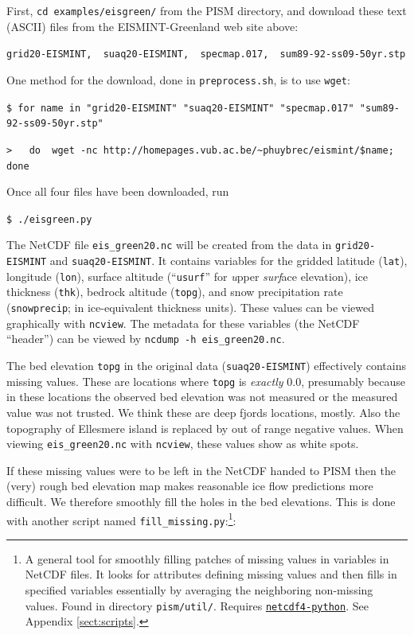\documentclass[11pt,final]{amsart}
\begin{document}
First, \verb|cd examples/eisgreen/| from the PISM directory, and download these text (ASCII) files from the EISMINT-Greenland web site above: 

\verb|grid20-EISMINT,  suaq20-EISMINT,  specmap.017,  sum89-92-ss09-50yr.stp|

\noindent One method for the download, done in \verb|preprocess.sh|, is to use \verb|wget|: \small

\verb|$ for name in "grid20-EISMINT" "suaq20-EISMINT" "specmap.017" "sum89-92-ss09-50yr.stp"|

\verb|>   do  wget -nc http://homepages.vub.ac.be/~phuybrec/eismint/$name;  done|

\normalsize\noindent Once all four files have been downloaded, run

\verb|$ ./eisgreen.py|

\noindent The NetCDF file \verb|eis_green20.nc| will be created from the data in \verb|grid20-EISMINT| and \verb|suaq20-EISMINT|.  It contains variables for the gridded latitude (\verb|lat|), longitude (\verb|lon|), surface altitude (``\verb|usurf|'' for \emph{u}pper \emph{surf}ace elevation), ice thickness (\verb|thk|), bedrock altitude (\verb|topg|), and snow precipitation rate (\verb|snowprecip|; in ice-equivalent thickness units).  These values can be viewed graphically with \verb|ncview|.  The metadata for these variables (the NetCDF ``header'') can be viewed by \verb|ncdump -h eis_green20.nc|.

The bed elevation \verb|topg| in the original data (\verb|suaq20-EISMINT|) effectively contains missing values.  These are locations where \verb|topg| is \emph{exactly} $0.0$, presumably because in these locations the observed bed elevation was not measured or the measured value was not trusted.  We think these are deep fjords locations, mostly.  Also the topography of Ellesmere island is replaced by out of range negative values.  When viewing \verb|eis_green20.nc| with \verb|ncview|, these values show as white spots.  

If these missing values were to be left in the NetCDF handed to PISM then the (very) rough bed elevation map makes reasonable ice flow predictions more difficult.  We therefore smoothly fill the holes in the bed elevations.  This is done with another script named \verb|fill_missing.py|:\footnote{A general tool for smoothly filling patches of missing values in variables in NetCDF files.  It looks for attributes defining missing values and then fills in specified variables essentially by averaging the neighboring non-missing values.  Found in directory \texttt{pism/util/}.  Requires \href{http://code.google.com/p/netcdf4-python/}{\texttt{netcdf4-python}}.  See Appendix \ref{sect:scripts}.}:
\end{document}

